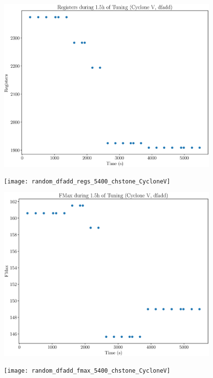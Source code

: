 \documentclass[12pt, a4paper]{article}
\begin{document}
\begin{figure}[htpb]
    \begin{minipage}{.48\textwidth}
        \includegraphics[scale=.25]{dfadd_regs_5400_chstone_CycloneV}
    \end{minipage}%
    \hfill
    \begin{minipage}{.48\textwidth}
        \texttt{[image: random\_dfadd\_regs\_5400\_chstone\_CycloneV]}
    \end{minipage}%

    \begin{minipage}{.48\textwidth}
        \includegraphics[scale=.25]{dfadd_fmax_5400_chstone_CycloneV}
    \end{minipage}%
    \hfill
    \begin{minipage}{.48\textwidth}
        \texttt{[image: random\_dfadd\_fmax\_5400\_chstone\_CycloneV]}
    \end{minipage}%
\end{figure}
\end{document}
